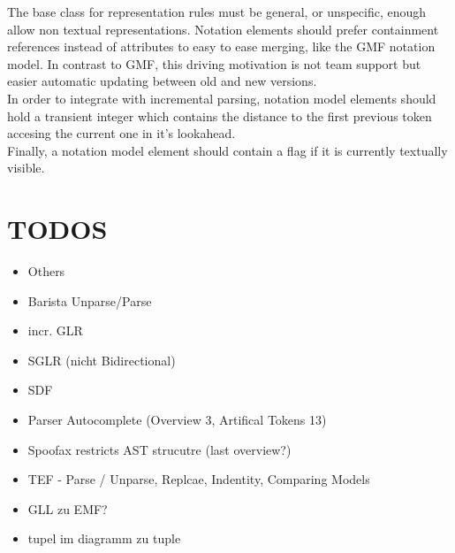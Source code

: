 The base class for representation rules must be general, or unspecific, enough allow non textual representations. Notation elements should prefer containment references instead of attributes to easy to ease merging, like the GMF notation model. In contrast to GMF, this driving motivation is not team support but easier automatic updating between old and new versions.\\
In order to integrate with incremental parsing, notation model elements should hold a transient integer which contains the distance to the first previous token accesing the current one in it's lookahead. \\
Finally, a notation model element should contain a flag if it is currently textually visible.





\chapter{TODOS}
\begin{itemize}
	\item Others
	\item Barista \- Unparse/Parse
	\item incr. GLR
	\item SGLR (nicht Bidirectional)
	\item SDF
	\item Parser Autocomplete (Overview 3, Artifical Tokens 13)
	\item Spoofax restricts AST strucutre (last overview?)
	\item TEF  - Parse / Unparse, Replcae, Indentity, Comparing Models
	\item GLL zu EMF?
	\item tupel im diagramm zu tuple
\end{itemize}

 


